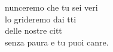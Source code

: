 \begin{cancion}[Annuncieremo][]%
	nunceremo che tu sei veri \\
	lo grideremo dai tti \\
	delle nostre citt\\
	senza paura e tu  puoi canre.\\
\end{cancion}%
